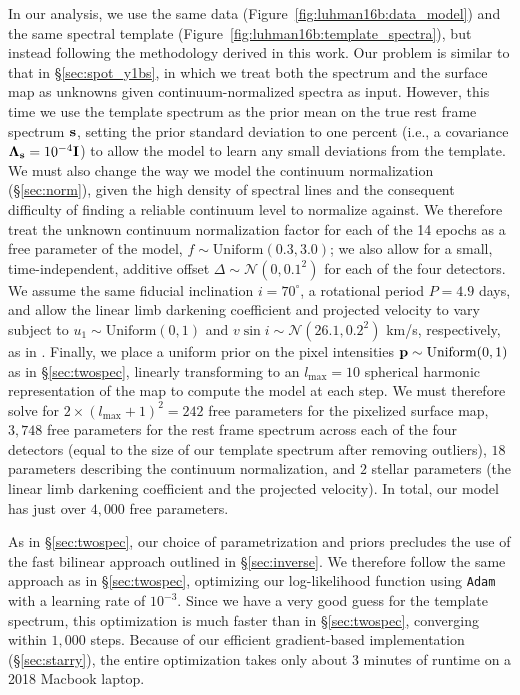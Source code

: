 \documentclass[modern]{aastex631}
\begin{document}
In our analysis, we use the same data (Figure~\ref{fig:luhman16b:data_model}) and the same spectral template (Figure~\ref{fig:luhman16b:template_spectra}), but instead following the methodology derived in this work.
Our problem is similar to that in \S\ref{sec:spot_y1bs}, in which we treat both the spectrum and the surface map as unknowns given continuum-normalized spectra as input.
However, this time we use the template spectrum as the prior mean on the true rest frame spectrum ${\mathbf{s}}$, setting the prior standard deviation to one percent (i.e., a covariance $\boldsymbol{\Lambda}_{\mathbf{s}} = 10^{-4}{\mathbf{I}}$) to allow the model to learn any small deviations from the template.
We must also change the way we model the continuum normalization (\S\ref{sec:norm}), given the high density of spectral lines and the consequent difficulty of finding a reliable continuum level to normalize against.
We therefore treat the unknown continuum normalization factor for each of the 14 epochs as a free parameter of the model, $f \sim \mathrm{Uniform}(0.3, 3.0)$; we also allow for a small, time-independent, additive offset $\Delta \sim \mathcal{N}(0, 0.1^2)$ for each of the four detectors.
We assume the same fiducial inclination $i = 70^\circ$, a rotational period $P = 4.9$ days, and allow the linear limb darkening coefficient and projected velocity to vary subject to $u_1 \sim \mathrm{Uniform}(0, 1)$ and $v \sin i \sim \mathcal{N}(26.1, 0.2^2)$ km/s, respectively, as in \citet{Crossfield2014}.
Finally, we place a uniform prior on the pixel intensities ${\mathbf{p}} \sim \mathrm{Uniform}(0, 1)$ as in \S\ref{sec:twospec}, linearly transforming to an $l_\mathrm{max} = 10$ spherical harmonic representation of the map to compute the model at each step.
We must therefore solve for $2 \times (l_\mathrm{max} + 1)^2 = 242$ free parameters for the pixelized surface map, $3,748$ free parameters for the rest frame spectrum across each of the four detectors (equal to the size of our template spectrum after removing outliers), $18$ parameters describing the continuum normalization, and $2$ stellar parameters (the linear limb darkening coefficient and the projected velocity).
In total, our model has just over $4,000$ free parameters.

As in \S\ref{sec:twospec}, our choice of parametrization and priors precludes the use of the fast bilinear approach outlined in \S\ref{sec:inverse}.
We therefore follow the same approach as in \S\ref{sec:twospec}, optimizing our log-likelihood function using \texttt{Adam} with a learning rate of $10^{-3}$.
Since we have a very good guess for the template spectrum, this optimization is much faster than in \S\ref{sec:twospec}, converging within $1,000$ steps.
Because of our efficient gradient-based implementation (\S\ref{sec:starry}), the entire optimization takes only about 3 minutes of runtime on a 2018 Macbook laptop.
\end{document}

